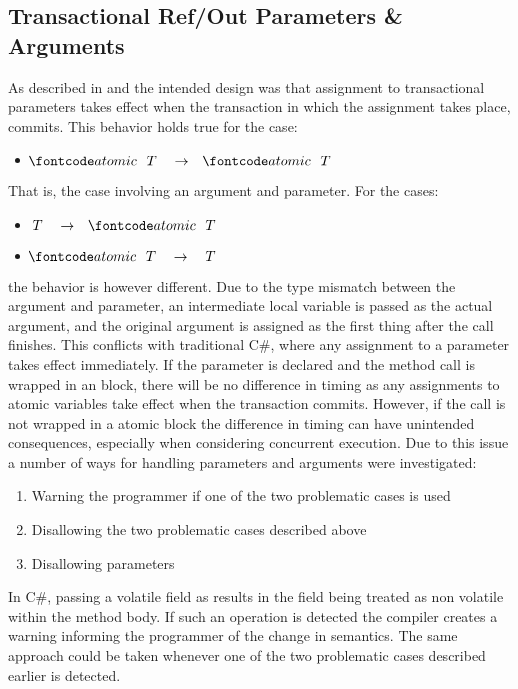 \subsection{Transactional Ref/Out Parameters \& Arguments}
As described in  and  the intended design was that assignment to transactional  parameters takes effect when the transaction in which the assignment takes place, commits. This behavior holds true for the case:
\begin{itemize}
	\item $\bscode{atomic} \quad T \quad \rightarrow \quad \bscode{atomic} \quad T$
\end{itemize}
That is, the case involving an  argument and parameter. For the cases:
\begin{itemize}
	\item $T \quad \rightarrow \quad \bscode{atomic} \quad T$
	\item $\bscode{atomic} \quad T \quad \rightarrow \quad T$
\end{itemize}
the behavior is however different. Due to the type mismatch between the argument and parameter, an intermediate local variable is passed as the actual argument, and the original argument is assigned as the first thing after the call finishes. This conflicts with traditional C\#, where any assignment to a  parameter takes effect immediately\cite[p. 76]{sestoft2011c}. If the parameter is declared  and the method call is wrapped in an  block, there will be no difference in timing as any assignments to atomic variables take effect when the transaction commits. However, if the call is not wrapped in a atomic block the difference in timing can have unintended consequences, especially when considering concurrent execution. Due to this issue a number of ways for handling  parameters and arguments were investigated:
\begin{enumerate}
	\item Warning the programmer if one of the two problematic cases is used
	\item Disallowing the two problematic cases described above
	\item Disallowing  parameters
\end{enumerate}
In C\#, passing a volatile field as  results in the field being treated as non volatile within the method body\cite{csharpVolatileRef}. If such an operation is detected the compiler creates a warning informing the programmer of the change in semantics. The same approach could be taken whenever one of the two problematic cases described earlier is detected.


